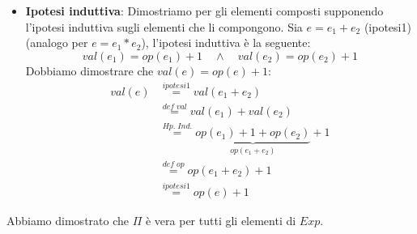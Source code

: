 \documentclass[a4paper]{article}
\begin{document}
\begin{exercise}
\begin{itemize}
    \item \textbf{Ipotesi induttiva}: Dimostriamo per gli elementi composti supponendo
      l'ipotesi induttiva sugli elementi che li compongono. Sia \( e = e_1 + e_2 \) (ipotesi1)
      (analogo per \( e = e_1 * e_2 \)), l'ipotesi induttiva è la seguente:
      \[
        val(e_1) = op(e_1) + 1 \quad \land \quad val(e_2) = op(e_2) + 1
      \] 
      Dobbiamo dimostrare che \( val(e) = op(e) + 1 \):
      \[
        \begin{aligned}
          val(e) &\stackrel{ipotesi1}{=} val(e_1 + e_2) \\
                 &\stackrel{def\; val}{=} val(e_1) + val(e_2) \\
                 &\stackrel{Hp.\; Ind.}{=} \underbrace{op(e_1) + 1 + op(e_2)}_{op(e_1 + e_2)} + 1 \\
                 &\stackrel{def\; op}{=} op(e_1 + e_2) + 1 \\
                 &\stackrel{ipotesi1}{=} op(e) + 1
        \end{aligned}
      \] 
  \end{itemize}
  Abbiamo dimostrato che \( \Pi \) è vera per tutti gli elementi di \( Exp \).
\end{exercise}
\end{document}
